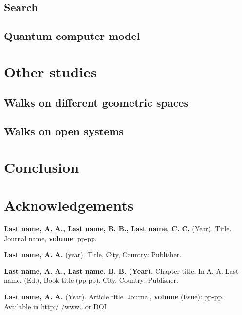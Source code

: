 \documentclass[journal, a4paper]{IEEEtran}
\begin{document}
\subsection{Search}
\subsection{Quantum computer model}

\section{Other studies}
\subsection{Walks on different geometric spaces}
\subsection{Walks on open systems}


\section{Conclusion}

\section{Acknowledgements}
	

\begin{thebibliography}{1}

	
	\textbf{Last  name,  A.  A.,  Last  name,  B.  B.,  Last  name,  C.  C.} (Year). Title. Journal name, \textbf{volume}: pp-pp.
	
	\textbf{Last name, A. A.} (year). Title, City, Country: Publisher.
	
	\textbf{Last name, A. A., Last name, B. B. (Year).} Chapter title.
    In A. A. Last name. (Ed.), Book title (pp-pp). City, Country: Publisher.

    \textbf{Last name, A. A.} (Year). Article title. Journal, 
    \textbf{volume} (issue): pp-pp. Available in http:/ /www...or  DOI

\end{thebibliography}

\newpage
\end{document}

